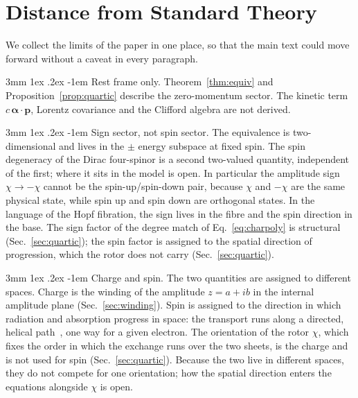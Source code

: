 \documentclass[%
 reprint, amsmath,amssymb, aps, prb, ]{revtex4-2}
\makeatletter
\numberwithin{equation}{section}
\renewcommand\paragraph{%
  \@startsection{paragraph}{4}{\z@}%
    {3mm \@plus 1ex \@minus .2ex}%
    {-1em}%
    {\normalfont\normalsize\itshape}}
\makeatother
\begin{document}
\section{Distance from Standard Theory}
\label{sec:limits}

We collect the limits of the paper in one place, so that the main text could move forward without a caveat in every paragraph.

\paragraph{Rest frame only.} Theorem~\ref{thm:equiv} and Proposition~\ref{prop:quartic} describe the zero-momentum sector. The kinetic term $c\,\bm{\alpha}\cdot\mathbf{p}$, Lorentz covariance and the Clifford algebra are not derived.

\paragraph{Sign sector, not spin sector.} The equivalence is two-dimensional and lives in the $\pm$ energy subspace at fixed spin. The spin degeneracy of the Dirac four-spinor is a second two-valued quantity, independent of the first; where it sits in the model is open. In particular the amplitude sign $\chi\to-\chi$ cannot be the spin-up/spin-down pair, because $\chi$ and $-\chi$ are the same physical state, while spin up and spin down are orthogonal states. In the language of the Hopf fibration, the sign lives in the fibre and the spin direction in the base. The sign factor of the degree match of Eq.~\eqref{eq:charpoly} is structural (Sec.~\ref{sec:quartic}); the spin factor is assigned to the spatial direction of progression, which the rotor does not carry (Sec.~\ref{sec:quartic}).

\paragraph{Charge and spin.} The two quantities are assigned to different spaces. Charge is the winding of the amplitude $z=a+ib$ in the internal amplitude plane (Sec.~\ref{sec:winding}). Spin is assigned to the direction in which radiation and absorption progress in space: the transport runs along a directed, helical path~\cite{ref:p51}, one way for a given electron. The orientation of the rotor $\chi$, which fixes the order in which the exchange runs over the two sheets, is the charge and is not used for spin (Sec.~\ref{sec:quartic}). Because the two live in different spaces, they do not compete for one orientation; how the spatial direction enters the equations alongside $\chi$ is open.
\end{document}
